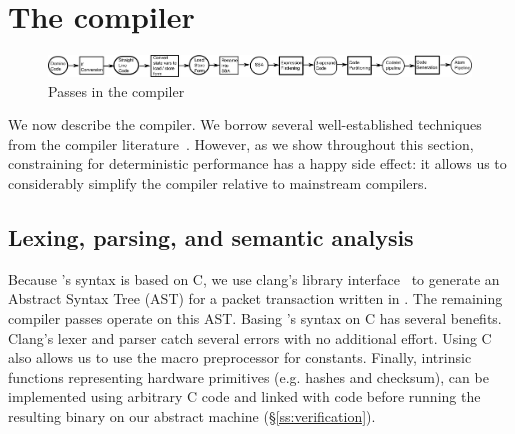 \section{The \pktlanguage compiler}
\label{s:compiler}

\begin{figure}[!t]
  \includegraphics[width=\textwidth]{compiler.pdf}
  \caption{Passes in the \pktlanguage compiler}
\end{figure}

We now describe the \pktlanguage compiler. We borrow several well-established
techniques from the compiler literature~\cite{muchnik}. However, as we show
throughout this section, constraining \pktlanguage for deterministic
performance has a happy side effect: it allows us to considerably simplify the
\pktlanguage compiler relative to mainstream compilers.

\subsection{Lexing, parsing, and semantic analysis}
Because \pktlanguage's syntax is based on C, we use clang's library
interface~\cite{libclang} to generate an Abstract Syntax Tree (AST) for a
packet transaction written in \pktlanguage. The remaining compiler passes
operate on this AST. Basing \pktlanguage's syntax on C has several benefits.
Clang's lexer and parser catch several errors with no additional effort. Using
C also allows us to use the macro preprocessor for constants. Finally,
intrinsic functions representing hardware primitives (e.g.  hashes and
checksum), can be implemented using arbitrary C code and linked with
\pktlanguage code before running the resulting binary on our abstract machine
(\S\ref{ss:verification}).

